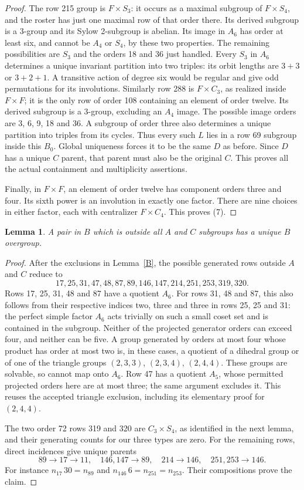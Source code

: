 \documentclass[11pt,a4paper]{article}
\newtheorem{lemma}{Lemma}\newtheorem{theorem}{Theorem}
\begin{document}
\begin{proof}
The row 215 group is $F\times S_3$: it occurs as a maximal subgroup
of $F\times S_4$, and the roster has just one maximal row of that
order there. Its derived subgroup is a 3-group and its Sylow 2-subgroup
is abelian. Its image in $A_6$ has order at least six, and cannot be
$A_4$ or $S_4$, by these two properties. The remaining possibilities
are $S_3$ and the orders 18 and 36 just handled. Every $S_3$ in
$A_6$ determines a unique invariant partition into two triples:
its orbit lengths are $3+3$ or $3+2+1$. A transitive action of degree
six would be regular and give odd permutations for its involutions.
Similarly row 288 is $F\times C_3$, as realized inside $F\times F$;
it is the only row of order 108 containing an element of order twelve.
Its derived subgroup is a 3-group, excluding an $A_4$ image. The
possible image orders are 3, 6, 9, 18 and 36. A subgroup of order
three also determines a unique partition into triples from its cycles.
Thus every such $L$ lies in a row 69 subgroup inside this $B_0$.
Global uniqueness forces it to be the same $D$ as before. Since $D$
has a unique $C$ parent, that parent must also be the original $C$.
This proves all the actual containment and multiplicity assertions.

Finally, in $F\times F$, an element of order twelve has component
orders three and four. Its sixth power is an involution in exactly
one factor. There are nine choices in either factor, each with
centralizer $F\times C_4$. This proves (7).
\end{proof}

\begin{lemma}\label{Bunique}
A pair in $B$ which is outside all $A$ and $C$ subgroups has a unique
$B$ overgroup.
\end{lemma}
\begin{proof}
After the exclusions in Lemma~\ref{B}, the possible generated rows
outside $A$ and $C$ reduce to
\[
        17,25,31,47,48,87,89,146,147,214,251,253,319,320.
\]
Rows 17, 25, 31, 48 and 87 have a quotient $A_6$. For rows 31, 48
and 87, this also follows from their respective indices two, three
and three in rows 25, 25 and 31: the perfect simple factor $A_6$
acts trivially on such a small coset set and is contained in the subgroup.
Neither of the
projected generator orders can exceed four, and neither can be five.
A group generated by orders at most four whose product has order at
most two is, in these cases, a quotient of a dihedral group or of
one of the triangle groups $(2,3,3)$, $(2,3,4)$, $(2,4,4)$.
These groups are solvable, so cannot map onto $A_6$. Row 47 has a
quotient $A_5$, whose permitted projected orders here are at most three;
the same argument excludes it. This reuses the accepted triangle
exclusion, including its elementary proof for $(2,4,4)$.

The two order 72 rows 319 and 320 are $C_3\times S_4$, as identified
in the next lemma, and their generating counts for our three types
are zero. For the remaining rows, direct incidences give unique parents
\[
 89\to17\to11,\quad146,147\to89,\quad214\to146,
 \quad251,253\to146.
\]
For instance $n_{17}\,30=n_{89}$ and $n_{146}\,6=n_{251}=n_{253}$.
Their compositions prove the claim.
\end{proof}
\end{document}
